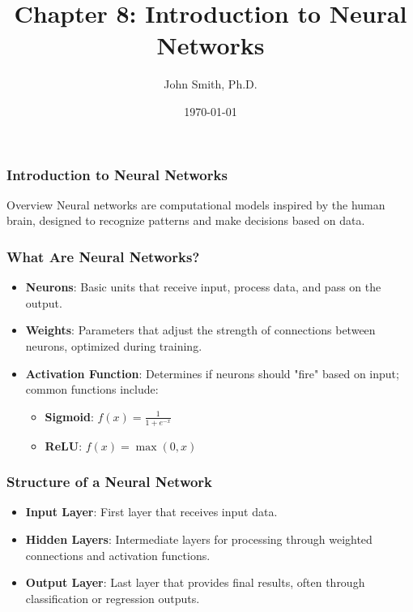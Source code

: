 \documentclass[aspectratio=169]{beamer}
\title[Chapter 8: Introduction to Neural Networks]{Chapter 8: Introduction to Neural Networks}
\author[J. Smith]{John Smith, Ph.D.}
\date{\today}
\begin{document}
\frame{\titlepage}

\begin{frame}[fragile]
    \frametitle{Introduction to Neural Networks}
    \begin{block}{Overview}
        Neural networks are computational models inspired by the human brain, designed to recognize patterns and make decisions based on data.
    \end{block}
\end{frame}

\begin{frame}[fragile]
    \frametitle{What Are Neural Networks?}
    \begin{itemize}
        \item \textbf{Neurons}: Basic units that receive input, process data, and pass on the output.
        \item \textbf{Weights}: Parameters that adjust the strength of connections between neurons, optimized during training.
        \item \textbf{Activation Function}: Determines if neurons should "fire" based on input; common functions include:
        \begin{itemize}
            \item \textbf{Sigmoid}: \( f(x) = \frac{1}{1 + e^{-x}} \)
            \item \textbf{ReLU}: \( f(x) = \max(0, x) \)
        \end{itemize}
    \end{itemize}
\end{frame}

\begin{frame}[fragile]
    \frametitle{Structure of a Neural Network}
    \begin{itemize}
        \item \textbf{Input Layer}: First layer that receives input data.
        \item \textbf{Hidden Layers}: Intermediate layers for processing through weighted connections and activation functions.
        \item \textbf{Output Layer}: Last layer that provides final results, often through classification or regression outputs.
    \end{itemize}
\end{frame}
\end{document}
